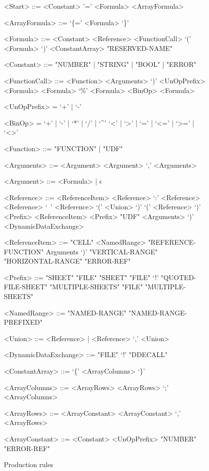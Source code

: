 \documentclass[conference]{IEEEtran}
\begin{document}
\begin{figure}
\caption{Production rules}
\label{figure:productions}
\centering
\begin{grammar}
<Start> ::= <Constant>
	\alt '=' <Formula>
	\alt <ArrayFormula>
	
<ArrayFormula> ::= `\{=' <Formula> `\}'

<Formula> ::= <Constant>
         \alt <Reference>
         \alt <FunctionCall>
         \alt `(' <Formula> `)'
         \alt <ConstantArray>
         \alt "RESERVED-NAME"
         
<Constant> ::= "NUMBER" | "STRING" | "BOOL" | "ERROR"
         
<FunctionCall> ::= <Function> <Arguments> `)'
		\alt <UnOpPrefix> <Formula>
		\alt <Formula> `\%'
		\alt <Formula> <BinOp> <Formula>
		
<UnOpPrefix> = `+' | `-'

<BinOp> = `+' | `-' | `*' | `/' | `\textasciicircum'
	\alt `<' | `>' | `=' | `<=' | `>=' | `<>'

<Function> ::= "FUNCTION" | "UDF"
	
<Arguments> ::= <Argument>
	\alt <Argument> `,' <Arguments>

<Argument> ::= <Formula> | $\epsilon$

<Reference> ::= <ReferenceItem>
	\alt <Reference> `:' <Reference>
	\alt <Reference> `\ ' <Reference>
	\alt `(' <Union> `)'
	\alt `(' <Reference> `)' 
	\alt <Prefix> <ReferenceItem>
    \alt <Prefix> "UDF" <Arguments> `)'
    \alt <DynamicDataExchange>
    
<ReferenceItem> ::= "CELL"
	\alt <NamedRange>
	\alt "REFERENCE-FUNCTION" Arguments `)'
	\alt "VERTICAL-RANGE"
	\alt "HORIZONTAL-RANGE"
	\alt "ERROR-REF"
	
<Prefix> ::= "SHEET"
	\alt "FILE" "SHEET"
	\alt "FILE" `!'
	\alt "QUOTED-FILE-SHEET"
	\alt "MULTIPLE-SHEETS"
	\alt "FILE" "MULTIPLE-SHEETS"
	
<NamedRange> ::= "NAMED-RANGE"
            \alt "NAMED-RANGE-PREFIXED"

<Union> ::= <Reference> | <Reference> `,' <Union>
	
<DynamicDataExchange> ::= "FILE" `!' "DDECALL"

<ConstantArray> ::= `\{' <ArrayColumns> `\}'

<ArrayColumns> ::= <ArrayRows>
	\alt <ArrayRows> `;' <ArrayColumns>

<ArrayRows> ::= <ArrayConstant>
	\alt <ArrayConstant> `,' <ArrayRows>
	
<ArrayConstant> ::= <Constant>
	\alt <UnOpPrefix> "NUMBER"
	\alt "ERROR-REF"

\end{grammar}
\end{figure}
\end{document}
